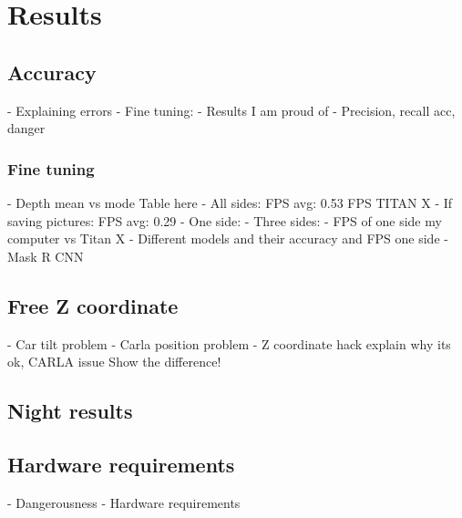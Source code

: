 \chapter{Results}
\label{chap:results}

\section{Accuracy}
- Explaining errors
- Fine tuning:
- Results I am proud of
- Precision, recall acc, danger


\subsection{Fine tuning}
- Depth mean vs mode
Table here
- All sides: FPS avg:  0.53 FPS TITAN X
  - If saving pictures: FPS avg:  0.29
- One side:
- Three sides:
- FPS of one side my computer vs Titan X
- Different models and their accuracy and FPS one side
- Mask R CNN
\section{Free Z coordinate}
- Car tilt problem
- Carla position problem
- Z coordinate hack explain why its ok, CARLA issue
    Show the difference!

\section{Night results}

\section{Hardware requirements}
- Dangerousness
- Hardware requirements